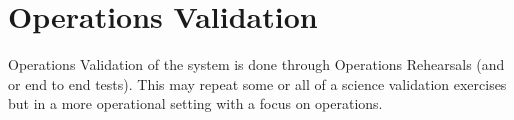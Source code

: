 
\section{Operations Validation}
 Operations Validation of the system is done through Operations Rehearsals (and or end to end tests).
 This may repeat some or all of a science validation exercises but in a more operational setting with a focus on operations.


